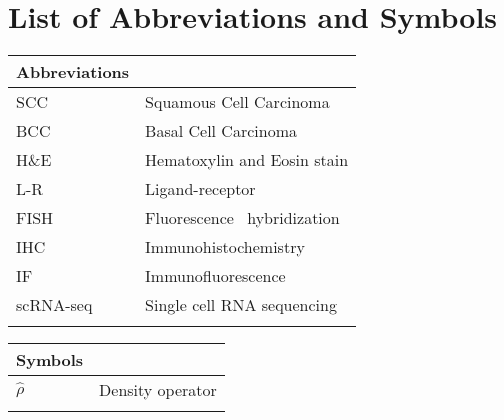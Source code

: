 %

\chapter[List of Abbreviations and Symbols]{List of Abbreviations and Symbols}


\begin{center}
	\small
	\begin{longtable}{ll}
	\toprule
	Abbreviations & {} \\
	\bottomrule
	SCC				& Squamous Cell Carcinoma \\
	BCC				& Basal Cell Carcinoma \\
	H\&E			& Hematoxylin and Eosin stain \\
	L-R             & Ligand-receptor \\
	FISH            & Fluorescence \situ~hybridization \\
	IHC             & Immunohistochemistry \\
	IF              & Immunofluorescence \\
	scRNA-seq       & Single cell RNA sequencing \\
	
	\etc{}		&	\etc{} \\
	\hline
	\end{longtable}
\end{center}

\begin{center}
	\small
	\begin{longtable}{ll}
	\toprule
	Symbols & {} \\
	\bottomrule
	$\hat{\rho}$		& Density operator \\
	\etc{}					& \etc{} \\
	\hline
	\end{longtable}
\end{center}

